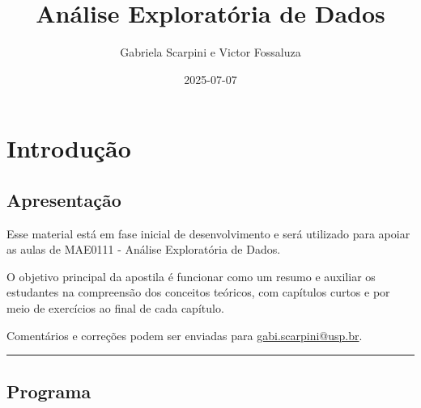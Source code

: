 \documentclass[
]{book}
\title{Análise Exploratória de Dados}
\author{Gabriela Scarpini e Victor Fossaluza}
\date{2025-07-07}
\begin{document}
\maketitle

{
\setcounter{tocdepth}{1}
\tableofcontents
}
\chapter{Introdução}\label{intro}

\section{Apresentação}\label{apresentauxe7uxe3o}

Esse material está em fase inicial de desenvolvimento e será utilizado para apoiar as aulas de MAE0111 - Análise Exploratória de Dados.

O objetivo principal da apostila é funcionar como um resumo e auxiliar os estudantes na compreensão dos conceitos teóricos, com capítulos curtos e por meio de exercícios ao final de cada capítulo.

Comentários e correções podem ser enviadas para \url{gabi.scarpini@usp.br}.

\begin{center}\rule{0.5\linewidth}{0.5pt}\end{center}

\section{Programa}\label{programa}
\end{document}
